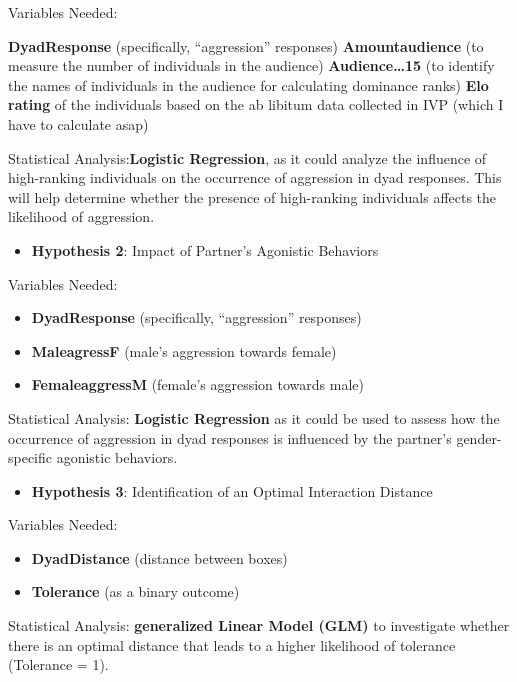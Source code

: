 \documentclass[
]{article}
\providecommand{\tightlist}{%
  \setlength{\itemsep}{0pt}\setlength{\parskip}{0pt}}
\begin{document}
Variables Needed:

\textbf{DyadResponse} (specifically, ``aggression'' responses)
\textbf{Amountaudience} (to measure the number of individuals in the
audience) \textbf{Audience\ldots15} (to identify the names of
individuals in the audience for calculating dominance ranks) \textbf{Elo
rating} of the individuals based on the ab libitum data collected in IVP
(which I have to calculate asap)

Statistical Analysis:\textbf{Logistic Regression}, as it could analyze
the influence of high-ranking individuals on the occurrence of
aggression in dyad responses. This will help determine whether the
presence of high-ranking individuals affects the likelihood of
aggression.

\begin{itemize}
\tightlist
\item
  \textbf{Hypothesis 2}: Impact of Partner's Agonistic Behaviors
\end{itemize}

Variables Needed:

\begin{itemize}
\tightlist
\item
  \textbf{DyadResponse} (specifically, ``aggression'' responses)
\item
  \textbf{MaleagressF} (male's aggression towards female)
\item
  \textbf{FemaleaggressM} (female's aggression towards male)
\end{itemize}

Statistical Analysis: \textbf{Logistic Regression} as it could be used
to assess how the occurrence of aggression in dyad responses is
influenced by the partner's gender-specific agonistic behaviors.

\begin{itemize}
\tightlist
\item
  \textbf{Hypothesis 3}: Identification of an Optimal Interaction
  Distance
\end{itemize}

Variables Needed:

\begin{itemize}
\tightlist
\item
  \textbf{DyadDistance} (distance between boxes)
\item
  \textbf{Tolerance} (as a binary outcome)
\end{itemize}

Statistical Analysis: \textbf{generalized Linear Model (GLM)} to
investigate whether there is an optimal distance that leads to a higher
likelihood of tolerance (Tolerance = 1).
\end{document}
